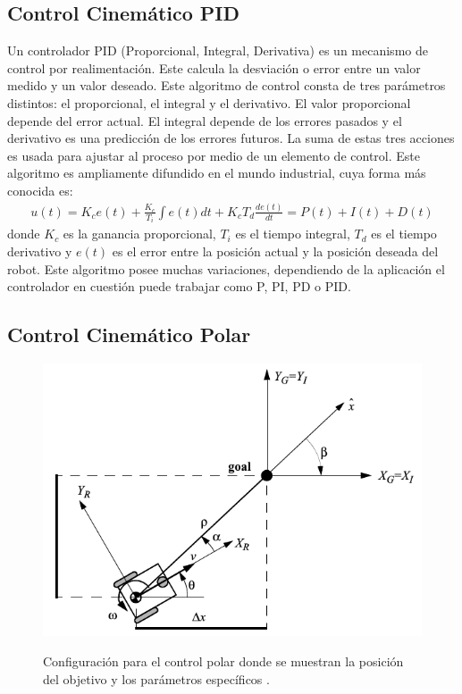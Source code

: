 \subsection{Control Cinem\'atico PID}

Un controlador PID (Proporcional, Integral, Derivativa) es un mecanismo de control 
por realimentaci\'on. Este calcula la desviaci\'on o error entre un valor medido y 
un valor deseado. Este algoritmo de control consta de tres par\'ametros distintos: el 
proporcional, el integral y el derivativo. El valor proporcional depende del error 
actual. El integral depende de los errores pasados y el derivativo es una predicci\'on 
de los errores futuros. La suma de estas tres acciones es usada para ajustar al 
proceso por medio de un elemento de control. Este algoritmo es ampliamente 
difundido en el mundo industrial, cuya forma m\'as conocida es:
\begin{align*}
u(t) = K_c e(t) + \frac{K_c}{T_i} \int e(t)dt + K_c T_d \frac{de(t)}{dt} = P(t) + I(t) + D(t)
\end{align*}
donde $K_c$ es la ganancia proporcional, $T_i$ es el tiempo integral, $T_d$ es 
el tiempo derivativo y $e(t)$ es el error entre la posici\'on actual y la posici\'on deseada
del robot. Este algoritmo posee muchas variaciones, dependiendo de la aplicaci\'on el controlador 
en cuesti\'on puede trabajar como P, PI, PD o PID.

\subsection{Control Cinem\'atico Polar}

\begin{figure}%
\centering \footnotesize
 {\includegraphics[width=0.60\linewidth]{images/control_polar.png}}
 \captionsetup{font=footnotesize}
 \caption{Configuraci\'on para el control polar donde se muestran la posici\'on del 
 objetivo y los par\'ametros espec\'ificos \cite{siegwart2011introduction}.}
\label{f:controlPolar}
\end{figure}

